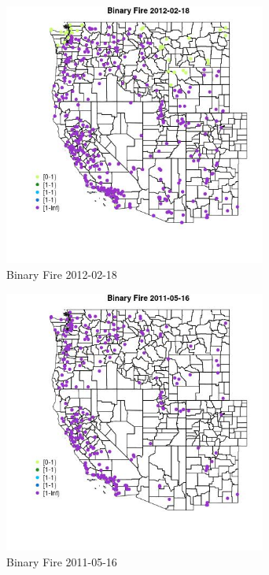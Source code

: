 \begin{figure} 
\centering  
\includegraphics[width=0.77\textwidth]{Code_Outputs/Report_ML_input_PM25_Step4_part_f_de_duplicated_aves_prioritize_24hr_obswNAs_MapObsBinary_Fire2012-02-18.jpg} 
\caption{\label{fig:Report_ML_input_PM25_Step4_part_f_de_duplicated_aves_prioritize_24hr_obswNAsMapObsBinary_Fire2012-02-18}Binary Fire 2012-02-18} 
\end{figure} 
 

\begin{figure} 
\centering  
\includegraphics[width=0.77\textwidth]{Code_Outputs/Report_ML_input_PM25_Step4_part_f_de_duplicated_aves_prioritize_24hr_obswNAs_MapObsBinary_Fire2011-05-16.jpg} 
\caption{\label{fig:Report_ML_input_PM25_Step4_part_f_de_duplicated_aves_prioritize_24hr_obswNAsMapObsBinary_Fire2011-05-16}Binary Fire 2011-05-16} 
\end{figure} 
 

